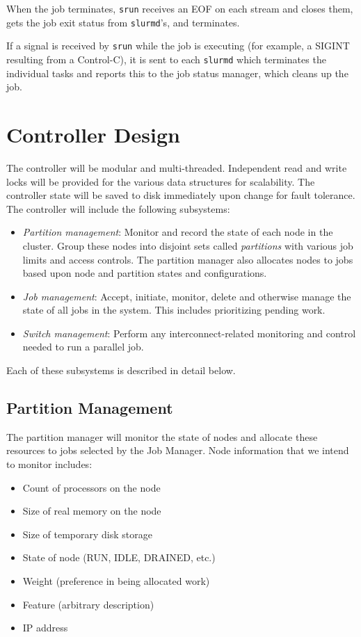 When the job terminates, {\tt srun} receives an EOF on each stream and
closes them, gets the job exit status from {\tt slurmd}'s, and terminates.

If a signal is received by {\tt srun} while the job is executing (for example,
a SIGINT resulting from a Control-C), it is sent to each {\tt slurmd} which 
terminates the individual tasks and reports this to the job status manager,
which cleans up the job.

\section{Controller Design}

The controller will be modular and multi-threaded. 
Independent read and write locks will be provided for the various data 
structures for scalability. 
The controller state will be saved to disk immediately upon change 
for fault tolerance.
The controller  will include the following subsystems:

\begin{itemize}
\item {\em Partition management}: Monitor and record the state of each 
node in the cluster.
Group these nodes into disjoint sets called {\em partitions} with various 
job limits and access controls.
The partition manager also allocates nodes to jobs based upon 
node and partition states and configurations. 

\item {\em Job management}: Accept, initiate, monitor, delete and otherwise 
manage the state of all jobs in the system. This includes prioritizing 
pending work.

\item {\em Switch management}: Perform any interconnect-related 
monitoring and control needed to run a parallel job.

\end{itemize}

Each of these subsystems is described in detail below.

\subsection{Partition Management}

The partition manager will monitor the state of nodes and allocate 
these resources to jobs selected by the Job Manager. 
Node information that we intend to monitor includes:

\begin{itemize}
\item Count of processors on the node
\item Size of real memory on the node
\item Size of temporary disk storage
\item State of node (RUN, IDLE, DRAINED, etc.)
\item Weight (preference in being allocated work)
\item Feature (arbitrary description)
\item IP address
\end{itemize}

